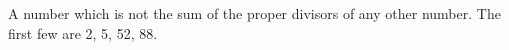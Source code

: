  A number which is not the sum of the proper divisors
of any other number. The first few are 2, 5, 52, 88.
